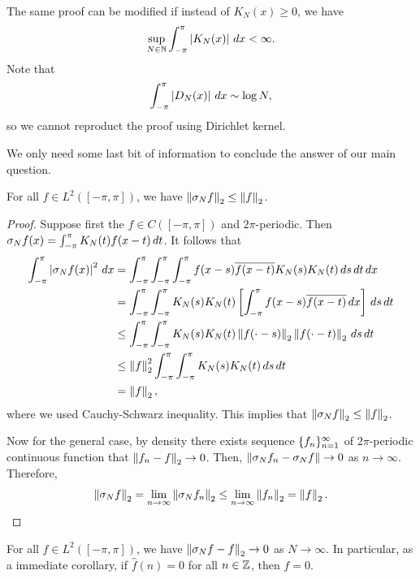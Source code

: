\documentclass[a4paper]{article}
\begin{document}
\begin{remark}
  The same proof can be modified if instead of $K_N(x) \geq 0$,
  we have
  \[
    \sup_{N \in \mathbb{N}} \int_{-\pi}^\pi \left\lvert K_N(x)\right\rvert \, d x < \infty.
  \]
  Note that
  \[
    \int_{-\pi}^\pi \left\lvert D_N(x)\right\rvert \, d x \sim \log N,
  \]
  so we cannot reproduct the proof using Dirichlet kernel.
\end{remark}

We only need some last bit of information to conclude
the answer of our main question.

\begin{thm}
  For all $f \in L^2([-\pi, \pi])$, we have
  $\left\lVert \sigma_N f\right\rVert_2 \leq \left\lVert f\right\rVert_2$.
\end{thm}

\begin{proof}
  Suppose first the $f \in C([-\pi, \pi])$ and $2\pi$-periodic.
  Then $\sigma_N f(x) = \int_{-\pi}^{\pi} K_N(t) f(x - t) \, d t$.
  It follows that
  \[
    \begin{aligned}
      \int_{-\pi}^\pi \left\lvert \sigma_N f(x)\right\rvert^2 \, d x
       & = \int_{-\pi}^\pi \int_{-\pi}^{\pi}
      \int_{-\pi}^{\pi} f(x - s) \overline{f(x - t)} K_N(s) K_N(t)
      \, d s \, d t \, d x                                           \\
       & = \int_{-\pi}^{\pi} \int_{-\pi}^{\pi} K_N(s)
      K_N(t) \left[ \int_{-\pi}^{\pi} f(x - s)
               \overline{f(x - t)} \, d x \right] \, d s \, d t           \\
       & \leq \int_{-\pi}^{\pi} \int_{-\pi}^{\pi}
      K_N(s) K_N(t) \left\lVert f(\cdot - s)\right\rVert_2 \left\lVert f(\cdot - t)\right\rVert_2
      \, d s \, d t                                                \\
       & \leq \left\lVert f\right\rVert_2^2 \int_{-\pi}^{\pi} \int_{-\pi}^{\pi}
      K_N(s) K_N(t) \, d s \, d t                                  \\
       & = \left\lVert f\right\rVert_2,
    \end{aligned}
  \]
  where we used Cauchy-Schwarz inequality.
  This implies that $\left\lVert \sigma_N f\right\rVert_2 \leq \left\lVert f\right\rVert_2$.

  Now for the general case, by density there exists
  sequence $\{ f_n \}_{n=1}^\infty$ of $2\pi$-periodic continuous
  function that $\left\lVert f_n - f\right\rVert_2 \to 0$. Then,
  $\left\lVert \sigma_N f_n - \sigma_N f\right\rVert \to 0$
  as $n \to \infty$. Therefore,
  \[
    \left\lVert \sigma_N f\right\rVert_2 = \lim_{n \to \infty} \left\lVert \sigma_N f_n\right\rVert_2
    \leq \lim_{n \to \infty} \left\lVert f_n\right\rVert_2 = \left\lVert f\right\rVert_2.
  \]
\end{proof}

\begin{thm}
  For all $f \in L^2([-\pi, \pi])$, we have
  $\left\lVert \sigma_N f - f\right\rVert_2 \to 0$ as $N \to \infty$.
  In particular, as a immediate corollary,
  if $\hat{f}(n) = 0$ for all $n \in \mathbb{Z}$,
  then $f = 0$.
\end{thm}
\end{document}
